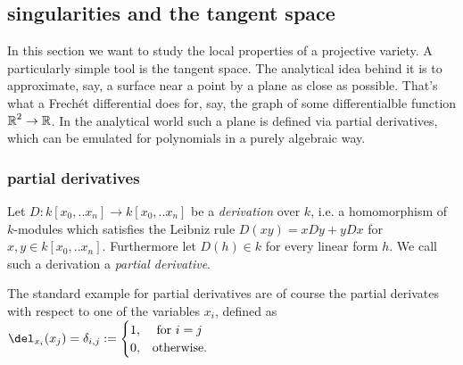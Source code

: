 \subsection{singularities and the tangent space}



In this section we want to study the local properties of a projective variety.
A particularly simple tool is the tangent space.
The analytical idea behind it is to approximate, say, a surface near a point by a plane as close as possible.
That's what a Frechét differential does for, say,  the graph of some differentialble function $\operatorname{\mathbb R}^2 \to \operatorname{\mathbb R}$.
In the analytical world such a plane is defined via partial derivatives, which can be emulated for polynomials in a purely algebraic way.

\subsubsection{partial derivatives}
\begin{definition}
Let $D : k[x_0,..x_n] \to k[x_0,..x_n]$ be a \emph{derivation} over $k$, i.e. a homomorphism of $k$-modules which satisfies the Leibniz rule $D(xy) = xDy+yDx$ for $x,y \in k[x_0,..x_n]$. Furthermore let $D(h) \in k$ for every linear form $h$. We call such a derivation a \emph{partial derivative}.
\end{definition}

\begin{example}
The standard example for partial derivatives are of course the partial derivates with respect to one of the variables $x_i$, defined as $\del_{x_i}(x_j) = \delta_{i,j} := \begin{cases} 1, & \text{ for } i = j \\ 0, & \text {otherwise.} \end{cases}$
\end{example}

